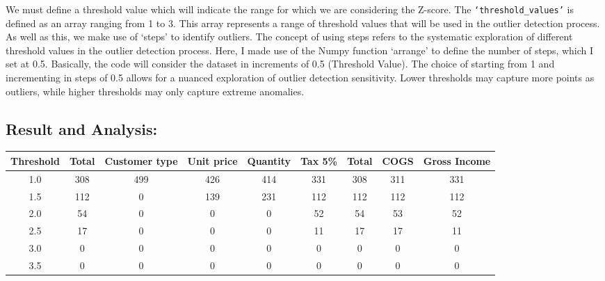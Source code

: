 We must define a threshold value which will indicate the range for which we are considering the Z-score. The \verb|‘threshold_values’| is defined as an array ranging from 1 to 3. This array represents a range of threshold values that will be used in the outlier detection process.
\newline 
As well as this, we make use of ‘steps’ to identify outliers. The concept of using steps refers to the systematic exploration of different threshold values in the outlier detection process. Here, I made use of the Numpy function ‘arrange’ to define the number of steps, which I set at 0.5. Basically, the code will consider the dataset in increments of 0.5 (Threshold Value).
\newline 
The choice of starting from 1 and incrementing in steps of 0.5 allows for a nuanced exploration of outlier detection sensitivity. Lower thresholds may capture more points as outliers, while higher thresholds may only capture extreme anomalies.


\subsection{Result and Analysis:}




\begin{table}[htbp]
\centering
{} %
\begin{adjustbox}{width=\textwidth}
\begin{tabular}{|c|c|c|c|c|c|c|c|c|}
\hline
\rowcolor{headercolor}
Threshold & Total & Customer type & Unit price & Quantity & Tax 5\% & Total & COGS & Gross Income \\
\hline
1.0 & 308 & 499 & 426 & 414 & 331 & 308 & 311 & 331 \\
1.5 & 112 & 0 & 139 & 231 & 112 & 112 & 112 & 112 \\
2.0 & 54 & 0 & 0 & 0 & 52 & 54 & 53 & 52 \\
2.5 & 17 & 0 & 0 & 0 & 11 & 17 & 17 & 11 \\
3.0 & 0 & 0 & 0 & 0 & 0 & 0 & 0 & 0 \\
3.5 & 0 & 0 & 0 & 0 & 0 & 0 & 0 & 0 \\
\hline
\end{tabular}
\end{adjustbox}
\end{table}


